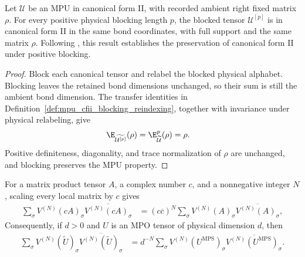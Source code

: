 \begin{lemma}
    \label{thm:mpu_canonical_form_ii_positive_blocking}
    \leanok
    Let $\mathcal U$ be an MPU in canonical form II, with recorded ambient
    right fixed matrix $\rho$. For every positive physical blocking length
    $p$, the blocked tensor $\mathcal U^{[p]}$ is in canonical form II in the
    same bond coordinates, with full support and the same matrix $\rho$.
    Following \cite[Proposition~III.1]{Cirac2017MPU}, this result establishes the preservation of canonical form II under positive
    blocking.
\end{lemma}

\begin{proof}\leanok
    Block each canonical tensor and relabel the blocked physical alphabet.
    Blocking leaves the retained bond dimensions unchanged, so their sum is
    still the ambient bond dimension. The transfer identities in
    Definition~\ref{def:mpu_cfii_blocking_reindexing}, together with invariance
    under physical relabeling, give
    \begin{align}
        \E_{\widetilde{\mathcal U^{[p]}}}(\rho)
         & =\E_{\widetilde{\mathcal U}}^p(\rho)=\rho.
    \end{align}
    Positive definiteness, diagonality,
    and trace normalization of $\rho$ are unchanged, and blocking preserves
    the MPU property.
\end{proof}

\begin{lemma}
    \label{thm:mpu_self_overlap_scaling}
    \leanok
    For a matrix product tensor $A$, a complex number $c$, and a nonnegative
    integer $N$, scaling every local matrix by $c$ gives
    \begin{align}
        \sum_\sigma V^{(N)}(cA)_\sigma
        \overline{V^{(N)}(cA)_\sigma}
         & =(c\overline c)^N
        \sum_\sigma V^{(N)}(A)_\sigma
        \overline{V^{(N)}(A)_\sigma},
        \label{eq:mpu_self_overlap_scaled}
    \end{align}
    Consequently, if $d>0$ and $U$ is an MPO tensor of physical dimension
    $d$, then
    \begin{align}
        \sum_\sigma V^{(N)}(\widetilde U)_\sigma
        \overline{V^{(N)}(\widetilde U)_\sigma}
         & =d^{-N}
        \sum_\sigma V^{(N)}(U^{\mathrm{MPS}})_\sigma
        \overline{V^{(N)}(U^{\mathrm{MPS}})_\sigma}.
        \label{eq:mpu_self_overlap_normalized}
    \end{align}
\end{lemma}

